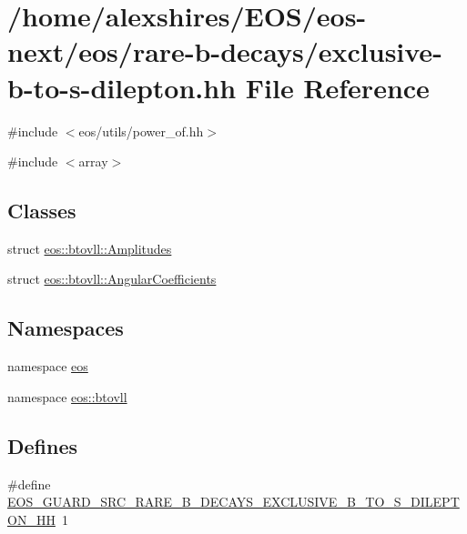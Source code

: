 \hypertarget{exclusive-b-to-s-dilepton_8hh}{
\section{/home/alexshires/EOS/eos-\/next/eos/rare-\/b-\/decays/exclusive-\/b-\/to-\/s-\/dilepton.hh File Reference}
\label{exclusive-b-to-s-dilepton_8hh}
}
{\ttfamily \#include $<$eos/utils/power\_\-of.hh$>$}\par
{\ttfamily \#include $<$array$>$}\par
\subsection*{Classes}
\begin{DoxyCompactItemize}
\item 
struct \hyperlink{structeos_1_1btovll_1_1Amplitudes}{eos::btovll::Amplitudes}
\item 
struct \hyperlink{structeos_1_1btovll_1_1AngularCoefficients}{eos::btovll::AngularCoefficients}
\end{DoxyCompactItemize}
\subsection*{Namespaces}
\begin{DoxyCompactItemize}
\item 
namespace \hyperlink{namespaceeos}{eos}
\item 
namespace \hyperlink{namespaceeos_1_1btovll}{eos::btovll}
\end{DoxyCompactItemize}
\subsection*{Defines}
\begin{DoxyCompactItemize}
\item 
\#define \hyperlink{exclusive-b-to-s-dilepton_8hh_abc2ad3337a546fab596884c2f5e8ffa6}{EOS\_\-GUARD\_\-SRC\_\-RARE\_\-B\_\-DECAYS\_\-EXCLUSIVE\_\-B\_\-TO\_\-S\_\-DILEPTON\_\-HH}~1
\end{DoxyCompactItemize}
